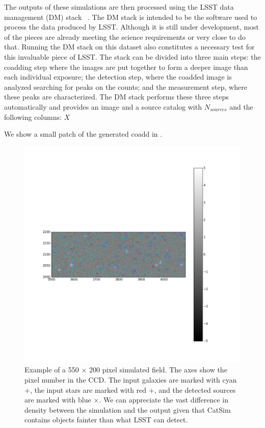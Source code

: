 \documentclass[\docopts]{\docclass}
\begin{document}
The outputs of these simulations are then processed using the LSST data management (DM) stack~\citep{Overview,ScienceBook,WhitePaper}  . The DM stack is intended to be the software used to process the data produced by LSST. Although it is still under development, most of the pieces are already meeting the science requirements or very close to do that. Running the DM stack on this dataset also constitutes a necessary test for this invaluable piece of LSST. The stack can be divided into three main steps: the coadding step where the images are put together to form a deeper image than each individual exposure; the detection step, where the coadded image is analyzed searching for peaks on the counts; and the measurement step, where these peaks are characterized. The DM stack performs these three steps automatically and provides an image and a source catalog with $N_{sources}$ and the following columns: $X$ 

We show a small patch of the generated coadd in .

\begin{figure}
\centering
\includegraphics[width=0.9\columnwidth]{field.png}
\caption{Example of a 550 $\times$ 200 pixel simulated field. The axes show the pixel number in the CCD. The input galaxies are marked with cyan $+$, the input stars are marked with red $+$, and the detected sources are marked with blue $\times$. We can appreciate the vast difference in density between the simulation and the output given that CatSim contains objects fainter than what LSST can detect.}
\label{fig:coadd_example}
\end{figure}
\end{document}
